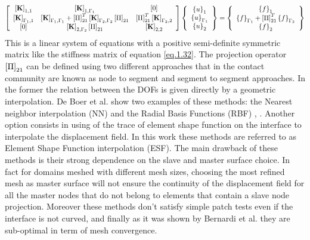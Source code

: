   \begin{equation}
  \label{eq.33}
  \begin{aligned}
  \left[ \begin{array}{ccc} 
      \left[{\mathbf{K}}\right]_{1,1} & \left[{\mathbf{K}}\right]_{1,\Gamma_1} & \left[{0}\right] \\
     \left[{\mathbf{K}}\right]_{\Gamma_1,1} & \left[{\mathbf{K}}\right]_{\Gamma_1,\Gamma_1}+ \left[{\Pi}\right]_{21}^T\left[{\mathbf{K}}\right]_{\Gamma_2,\Gamma_2}\left[{\Pi}\right]_{21} & \left[{\Pi}\right]_{21}^T\left[{\mathbf{K}}\right]_{\Gamma_2,2}\\   
      \left[{0}\right] & \left[{\mathbf{K}}\right]_{2,\Gamma_2}\left[{\Pi}\right]_{21} & \left[{\mathbf{K}}\right]_{2,2}\end{array} \right] \left\lbrace \begin{array}{c} \left\lbrace{u}\right \rbrace_1\\\left\lbrace{u}\right \rbrace_{\Gamma_1}\\\left\lbrace{u}\right \rbrace_2
      \end{array}\right\rbrace= \left\lbrace\begin{array}{c} \left\lbrace{f}\right \rbrace_1\\\left\lbrace{f}\right \rbrace_{\Gamma_1}+\left[{\Pi}\right]_{21}^T\left\lbrace{f}\right \rbrace_{\Gamma_2}\\\left\lbrace{f}\right \rbrace_2
      \end{array}\right\rbrace
  \end{aligned}
  \end{equation}
  This is a linear system of equations with a positive semi-definite symmetric matrix like the stiffness matrix of equation \eqref{eq.1.32}. 
  The projection operator $\left[{\Pi}\right]_{21}$ can be defined using two different approaches that in the contact community are known as node to segment and segment to segment approaches. In the former the relation between the DOFs is given directly by a geometric interpolation. De Boer et al. \cite{de2007review} show two examples of these methods: the Nearest neighbor interpolation (NN) \cite{thevenaz2000interpolation} and the Radial Basis Functions (RBF) \cite{beckert2001multivariate}, \cite{smith2000evaluation}. Another option consists in using of the trace of element shape function on the interface to interpolate the displacement field. In this work these methods are referred to as Element Shape Function interpolation (ESF).
  The main drawback of these methods is their strong dependence on the slave and master surface choice. In fact for domains meshed with different mesh sizes, choosing the most refined mesh as master surface will not ensure the continuity of the displacement field for all the master nodes that do not belong to elements that contain a slave node projection. Moreover these methods don't satisfy simple patch tests even if the interface is not curved, and finally as it was shown by Bernardi et al. \cite{bernardi1989new} they are sub-optimal in term of mesh convergence.
